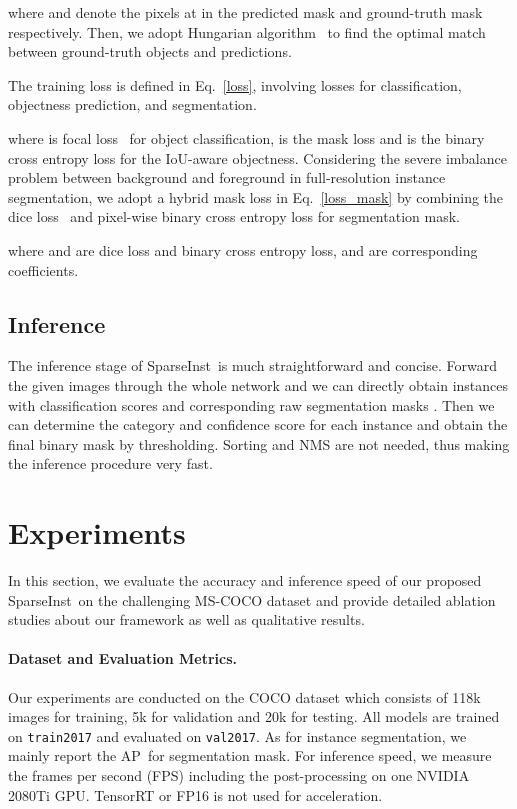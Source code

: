 \documentclass[10pt,twocolumn,letterpaper]{article}
\newcommand{\name}{SparseInst}
\newcommand{\apm}{AP}
\begin{document}
where  and  denote the pixels at  in the predicted mask  and ground-truth mask  respectively.
Then, we adopt Hungarian algorithm~\cite{HungarianStewartAN16} to find the optimal match between  ground-truth objects and  predictions. 


The training loss is defined in Eq.~\eqref{loss}, involving losses for classification, objectness prediction, and segmentation.

where  is focal loss~\cite{FocalLinGGHD17} for object classification,  is the mask loss and  is the binary cross entropy loss for the IoU-aware objectness.
Considering the severe imbalance problem between background and foreground in full-resolution instance segmentation, we adopt a hybrid mask loss in Eq.~\eqref{loss_mask} by combining the dice loss~\cite{MilletariNA16} and pixel-wise binary cross entropy loss for segmentation mask.

where  and  are dice loss and binary cross entropy loss,   and  are corresponding coefficients.








\subsection{Inference}
The inference stage of \name~is much straightforward and concise. Forward the given images through the whole network and we can directly obtain  instances with classification scores  and corresponding raw segmentation masks . Then we can determine the category and confidence score for each instance and obtain the final binary mask by thresholding. Sorting and NMS are not needed, thus making the inference procedure very fast.


\section{Experiments}
\label{expr}
In this section, we evaluate the accuracy and inference speed of our proposed \name~on the challenging MS-COCO dataset and provide detailed ablation studies about our framework as well as qualitative results.

\paragraph{Dataset and Evaluation Metrics.} Our experiments are conducted on the COCO dataset \cite{COCOLinMBHPRDZ14} which consists of 118k images for training, 5k for validation and 20k for testing.
All models are trained on \texttt{train2017} and evaluated on \texttt{val2017}. As for instance segmentation, we mainly report the \apm~for segmentation mask. For inference speed, we measure the frames per second (FPS) including the post-processing on one NVIDIA 2080Ti GPU.
TensorRT or FP16 is not used for acceleration.
\end{document}
